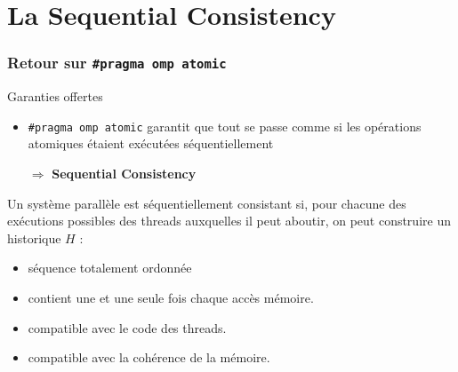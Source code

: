 \documentclass[xcolor={x11names,svgnames}]{beamer}
\begin{document}

\section{La Sequential Consistency}

\begin{frame}[label=seq_cst]
  \frametitle{Retour sur \texttt{\#pragma omp atomic}}

  \begin{exampleblock}{Garanties offertes}
    \begin{itemize}
    \item \texttt{\#pragma omp atomic} \alert{garantit} que tout se passe comme
      si les opérations atomiques étaient exécutées séquentiellement

    \item[$\Rightarrow$] \og \textbf{Sequential Consistency}\fg{}
    \end{itemize}
  \end{exampleblock}

  \pause
  
  \begin{definition}
    Un système parallèle est \alert{séquentiellement consistant} si, pour
    chacune des exécutions possibles des threads auxquelles il peut aboutir, on
    peut construire un \alert{historique} $H$ :
    \begin{itemize}
    \item séquence totalement ordonnée
    \item contient une et une seule fois chaque accès mémoire.
    \item compatible avec le code des threads.
    \item compatible avec la cohérence de la mémoire.
    \end{itemize}
  \end{definition}
\end{frame}


\newcommand{\po}{\xrightarrow{po}}
\newcommand{\rf}{{\color{red}\xrightarrow{rf}}}
\newcommand{\fr}{{\color{green}\xrightarrow{fr}}}
\newcommand{\co}{{\color{blue}\xrightarrow{co}}}
\end{document}
